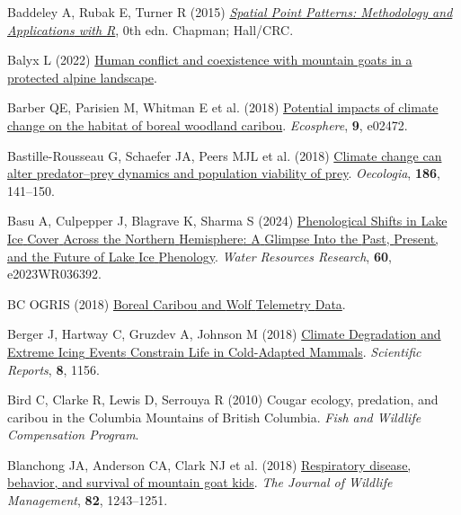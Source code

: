 \documentclass[
  12pt,
]{article}
\newlength{\cslhangindent}
\newenvironment{CSLReferences}[2] %
 {\begin{list}{}{%
  \setlength{\itemindent}{0pt}
  \setlength{\leftmargin}{0pt}
  \setlength{\parsep}{0pt}
  \ifodd #1
   \setlength{\leftmargin}{\cslhangindent}
   \setlength{\itemindent}{-1\cslhangindent}
  \fi
  \setlength{\itemsep}{#2\baselineskip}}}
 {\end{list}}
\begin{document}
\begin{CSLReferences}{1}{0}
Baddeley A, Rubak E, Turner R (2015) \emph{\emph{\href{https://doi.org/10.1201/b19708}{Spatial {Point} {Patterns}: {Methodology} and {Applications} with {R}}}}, 0th edn. Chapman; Hall/CRC.

Balyx L (2022) \href{https://doi.org/10.14288/1.0416294}{Human conflict and coexistence with mountain goats in a protected alpine landscape}.

Barber QE, Parisien M, Whitman E et al. (2018) \href{https://doi.org/10.1002/ecs2.2472}{Potential impacts of climate change on the habitat of boreal woodland caribou}. \emph{Ecosphere}, \textbf{9}, e02472.

Bastille-Rousseau G, Schaefer JA, Peers MJL et al. (2018) \href{https://doi.org/10.1007/s00442-017-4017-y}{Climate change can alter predator--prey dynamics and population viability of prey}. \emph{Oecologia}, \textbf{186}, 141--150.

Basu A, Culpepper J, Blagrave K, Sharma S (2024) \href{https://doi.org/10.1029/2023WR036392}{Phenological {Shifts} in {Lake} {Ice} {Cover} {Across} the {Northern} {Hemisphere}: {A} {Glimpse} {Into} the {Past}, {Present}, and the {Future} of {Lake} {Ice} {Phenology}}. \emph{Water Resources Research}, \textbf{60}, e2023WR036392.

BC OGRIS (2018) \href{https://www.bcogris.ca/projects/boreal-caribou-telemetry-data}{Boreal {Caribou} and {Wolf} {Telemetry} {Data}}.

Berger J, Hartway C, Gruzdev A, Johnson M (2018) \href{https://doi.org/10.1038/s41598-018-19416-9}{Climate {Degradation} and {Extreme} {Icing} {Events} {Constrain} {Life} in {Cold}-{Adapted} {Mammals}}. \emph{Scientific Reports}, \textbf{8}, 1156.

Bird C, Clarke R, Lewis D, Serrouya R (2010) Cougar ecology, predation, and caribou in the {Columbia} {Mountains} of {British} {Columbia}. \emph{Fish and Wildlife Compensation Program}.

Blanchong JA, Anderson CA, Clark NJ et al. (2018) \href{https://doi.org/10.1002/jwmg.21470}{Respiratory disease, behavior, and survival of mountain goat kids}. \emph{The Journal of Wildlife Management}, \textbf{82}, 1243--1251.


\end{CSLReferences}
\end{document}
